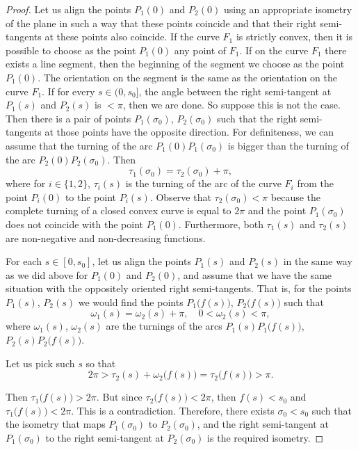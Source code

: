 \documentclass[11pt,oneside]{amsart}
\theoremstyle{theorem}
\theoremstyle{definition}
\theoremstyle{remark}
\begin{document}
\begin{proof}
Let us align the points $P_1(0)$ and $P_2(0)$ using an appropriate isometry of the plane in such a way that these points coincide and that their right semi-tangents at these points also coincide. 
If the curve $F_1$ is strictly convex, then it is possible to choose as the point $P_1(0)$ any point of $F_1$. If on the curve $F_1$ there exists a line segment, then the beginning of the segment we choose as the point $P_1(0)$. The orientation on the segment is the same as the orientation on the curve $F_1$.
If for every $s \in (0, s_0]$, the angle between the right semi-tangent at $P_1(s)$ and $P_2(s)$ is $<\pi$, then we are done. So suppose this is not the case. Then there is a pair of points $P_1(\sigma_0)$, $P_2(\sigma_0)$ such that the right semi-tangents at those points have the opposite direction. For definiteness, we can assume that the turning of the arc $P_1(0)P_1(\sigma_0)$ is bigger than the turning of the arc $P_2(0)P_2(\sigma_0)$. Then
\[
\tau_1(\sigma_0) = \tau_2(\sigma_0) + \pi,
\] 
where for $i \in \{1,2\}$, $\tau_i(s)$ is the turning of the arc of the curve $F_i$ from the point $P_i(0)$ to the point $P_i(s)$. Observe that $\tau_2(\sigma_0) < \pi$ because the complete turning of a closed convex curve is equal to $2\pi$ and the point $P_1(\sigma_0)$ does not coincide with the point $P_1(0)$. Furthermore, both $\tau_1(s)$ and $\tau_2(s)$ are non-negative and non-decreasing functions.

For each $s \in [0, s_0]$, let us align the points $P_1(s)$ and $P_2(s)$ in the same way as we did above for $P_1(0)$ and $P_2(0)$, and assume that we have the same situation with the oppositely oriented right semi-tangents. That is, for the points $P_1(s)$, $P_2(s)$ we would find the points $P_1\big(f(s)\big)$, $P_2\big(f(s)\big)$ such that
\[
\omega_1(s) = \omega_2(s) + \pi, \quad 0 < \omega_2(s) < \pi,
\]  
where $\omega_1(s)$, $\omega_2(s)$ are the turnings of the arcs $P_1(s) P_1\big(f(s)\big)$, $P_2(s) P_2\big(f(s)\big)$.

Let us pick such $s$ so that
 \begin{equation}\label{turning}
    2\pi > \tau_2(s) + \omega_2\big(f(s)\big) = \tau_2\big(f(s)\big) > \pi.
 \end{equation}
 
Then $\tau_1\big(f(s)\big) > 2\pi$. But since $\tau_2\big(f(s)\big) < 2\pi$, then $f(s) < s_0$ and $\tau_1\big(f(s)\big) < 2\pi$. This is a contradiction. Therefore, there exists $\sigma_0 < s_0$ such that the isometry that maps $P_1(\sigma_0)$ to $P_2(\sigma_0)$, and the right semi-tangent at $P_1(\sigma_0)$ to the right semi-tangent at $P_2(\sigma_0)$ is the required isometry.


\end{proof}
\end{document}
